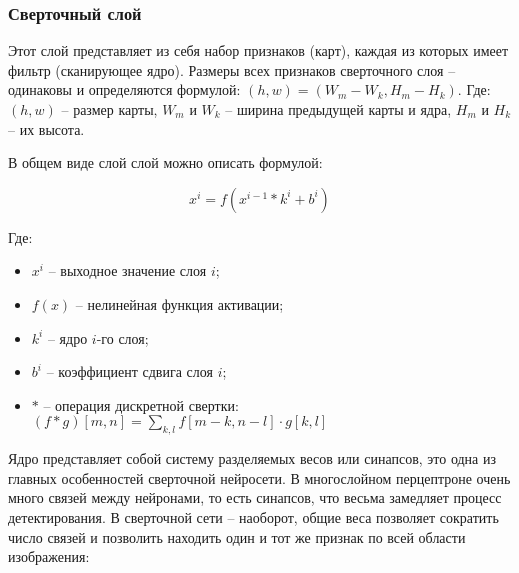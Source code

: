 \subsubsection{Сверточный слой}

Этот слой представляет из себя набор признаков (карт), каждая из которых имеет фильтр (сканирующее ядро)\cite{lib-cnn}. Размеры всех признаков сверточного слоя -- одинаковы и определяются формулой: $(h,w) = (W_m-W_k, H_m-H_k)$. Где: $(h,w)$ -- размер карты, $W_m$ и $W_k$ -- ширина предыдущей карты и ядра, $H_m$ и $H_k$ -- их высота.

В общем виде слой слой можно описать формулой:

$$
x^i = f(x^{i-1}*k^i+b^i)
$$

Где:
\begin{itemize}
    \item $x^i$ -- выходное значение слоя $i$;
    \item $f(x)$ -- нелинейная функция активации;
    \item $k^i$ -- ядро $i$-го слоя;
    \item $b^i$ -- коэффициент сдвига слоя $i$;
    \item $*$ -- операция дискретной свертки: $(f*g)[m,n]=\sum_{k,l} f[m-k,n-l]\cdot g[k,l]$
\end{itemize}


Ядро представляет собой систему разделяемых весов или синапсов, это одна из главных особенностей сверточной нейросети. В многослойном перцептроне \cite{lib-perciptrone} очень много связей между нейронами, то есть синапсов, что весьма замедляет процесс детектирования. В сверточной сети -- наоборот, общие веса позволяет сократить число связей и позволить находить один и тот же признак по всей области изображения:

